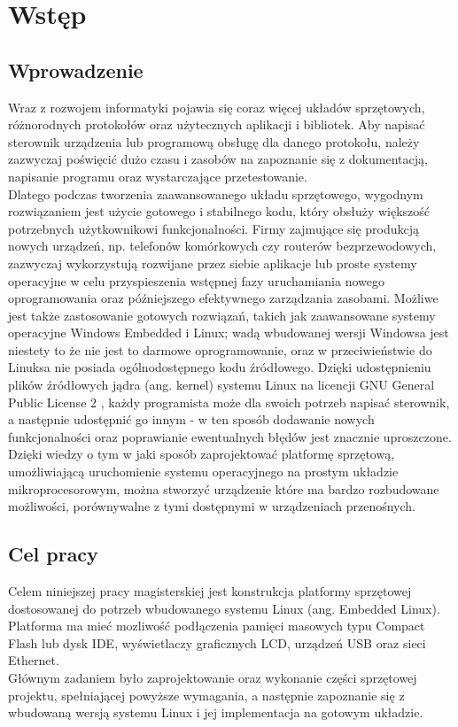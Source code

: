 \documentclass[a4paper,12pt]{book}
\begin{document}
	\tableofcontents

	\pagestyle{plain}
	

	\chapter{Wstęp}
		\section{Wprowadzenie}
			Wraz z rozwojem informatyki pojawia się coraz więcej układów sprzętowych, różnorodnych protokołów oraz użytecznych aplikacji i bibliotek. Aby napisać sterownik urządzenia lub programową obsługę dla danego protokołu, należy zazwyczaj poświęcić dużo czasu i zasobów na zapoznanie się z dokumentacją, napisanie programu oraz wystarczające przetestowanie.\\
			Dlatego podczas tworzenia zaawansowanego układu sprzętowego, wygodnym rozwiązaniem jest użycie gotowego i stabilnego kodu, który obsłuży większość potrzebnych użytkownikowi funkcjonalności. Firmy zajmujące się produkcją nowych urządzeń, np. telefonów komórkowych czy routerów bezprzewodowych, zazwyczaj wykorzystują rozwijane przez siebie aplikacje lub proste systemy operacyjne w celu przyspieszenia wstępnej fazy uruchamiania nowego oprogramowania oraz późniejszego efektywnego zarządzania zasobami. Możliwe jest także zastosowanie gotowych rozwiązań, takich jak zaawansowane systemy operacyjne Windows Embedded i Linux; wadą wbudowanej wersji Windowsa jest niestety to że nie jest to darmowe oprogramowanie, oraz w przeciwieństwie do Linuksa nie posiada ogólnodostępnego kodu źródłowego. Dzięki udostępnieniu plików źródłowych jądra (ang. kernel) systemu Linux na licencji GNU General Public License 2 \cite{website:gnu_gpl_v2}, każdy programista może dla swoich potrzeb napisać sterownik, a następnie udostępnić go innym - w ten sposób dodawanie nowych funkcjonalności oraz poprawianie ewentualnych błędów jest znacznie uproszczone.\\
			Dzięki wiedzy o tym w jaki sposób zaprojektować platformę sprzętową, umożliwiającą uruchomienie systemu operacyjnego na prostym układzie mikroprocesorowym, można stworzyć urządzenie które ma bardzo rozbudowane możliwości, porównywalne z tymi dostępnymi w urządzeniach przenośnych.
		\section{Cel pracy}
			Celem niniejszej pracy magisterskiej jest konstrukcja platformy sprzętowej dostosowanej do potrzeb wbudowanego systemu Linux (ang. Embedded Linux). Platforma ma mieć mozliwość podłączenia pamięci masowych typu Compact  Flash lub dysk IDE, wyświetlaczy graficznych LCD, urządzeń USB oraz sieci Ethernet.\\
			Głównym zadaniem było zaprojektowanie oraz wykonanie części sprzętowej projektu, spełniającej powyższe wymagania, a następnie zapoznanie się z wbudowaną wersją systemu Linux i jej implementacja na gotowym układzie.\\
\end{document}
